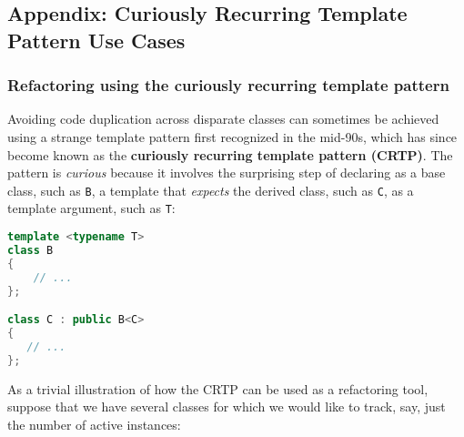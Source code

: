 \subsection[Appendix: Curiously Recurring Template Pattern Use Cases]{Appendix: Curiously Recurring Template Pattern Use Cases}\label{appendix:-crtp-use-cases}

\subsubsection[Refactoring using the curiously recurring template pattern]{Refactoring using the curiously recurring template pattern}\label{refactoring-using-the-curiously-recurring-template-pattern}

Avoiding code duplication across disparate classes can sometimes be
achieved using a strange template pattern first recognized in the
mid-90s, which has since become known as the \textbf{curiously recurring
template pattern (CRTP)}. The pattern is \emph{curious} because it
involves the surprising step of declaring as a base class, such as
\texttt{B}, a template that \emph{expects} the derived class, such as
\texttt{C}, as a template argument, such as \texttt{T}:

\begin{lstlisting}[language=C++]
template <typename T>
class B
{
    // ...
};

class C : public B<C>
{
   // ...
};
\end{lstlisting}

\noindent As a trivial illustration of how the CRTP can be used as a refactoring tool,
suppose that we have several classes for which we would like to track,
say, just the number of active instances:

